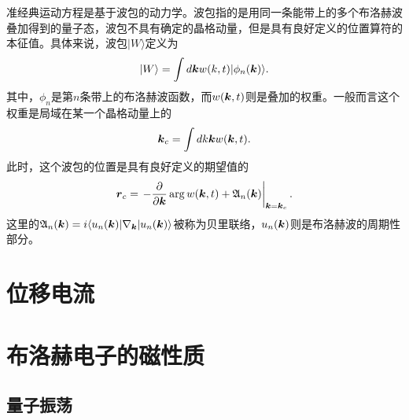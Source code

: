 准经典运动方程是基于波包的动力学。波包指的是用同一条能带上的多个布洛赫波叠加得到的量子态，波包不具有确定的晶格动量，但是具有良好定义的位置算符的本征值。具体来说，波包$|W\rangle$定义为
\begin{equation}
|W\rangle=\int d\boldsymbol{k} w(k, t)|\phi_n(\boldsymbol{k})\rangle.
\end{equation}
其中，$\phi_n$是第$n$条带上的布洛赫波函数，而$w(\boldsymbol{k},t)$则是叠加的权重。一般而言这个权重是局域在某一个晶格动量上的
\begin{equation}
\boldsymbol{k}_c = \int dk \boldsymbol{k} w(\boldsymbol{k},t).
\end{equation}
此时，这个波包的位置是具有良好定义的期望值的
\begin{equation}
\boldsymbol{r}_c = \left. -\frac{\partial}{\partial \boldsymbol{k}} \arg w(\boldsymbol{k}, t) + \mathfrak{A}_n(\boldsymbol{k})\right|_{\boldsymbol{k}=\boldsymbol{k}_c}.
\end{equation}
这里的$\mathfrak{A}_n(\boldsymbol{k})=i \langle u_n(\boldsymbol{k})|\nabla_{\boldsymbol{k}}|u_n(\boldsymbol{k}) \rangle$被称为贝里联络，$u_n(\boldsymbol{k})$则是布洛赫波的周期性部分。
\section{位移电流}
\section{布洛赫电子的磁性质}
\subsection{量子振荡}